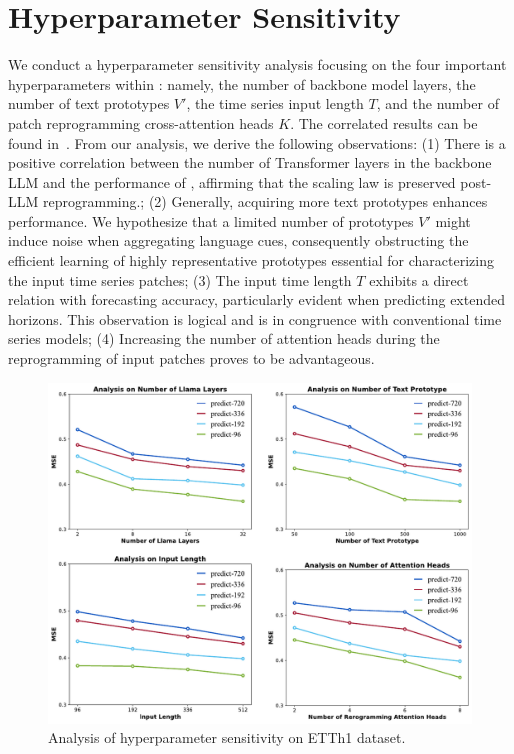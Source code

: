 \section{Hyperparameter Sensitivity}
We conduct a hyperparameter sensitivity analysis focusing on the four important hyperparameters within \method: namely, the number of backbone model layers, the number of text prototypes $V'$, the time series input length $T$, and the number of patch reprogramming cross-attention heads $K$. The correlated results can be found in~. From our analysis, we derive the following observations: (1) There is a positive correlation between the number of Transformer layers in the backbone LLM and the performance of \method, affirming that the scaling law is preserved post-LLM reprogramming.; (2) Generally, acquiring more text prototypes enhances performance. We hypothesize that a limited number of prototypes $V'$ might induce noise when aggregating language cues, consequently obstructing the efficient learning of highly representative prototypes essential for characterizing the input time series patches; (3) The input time length $T$ exhibits a direct relation with forecasting accuracy, particularly evident when predicting extended horizons. This observation is logical and is in congruence with conventional time series models; (4) Increasing the number of attention heads during the reprogramming of input patches proves to be advantageous.


\begin{figure}[!htbp]
\begin{center}
\centerline{\includegraphics[width=0.95\columnwidth]{figures/sensitivity.pdf}}
	\caption{Analysis of hyperparameter sensitivity on ETTh1 dataset.}
	\label{fig:visual_sensitivity}
\end{center}
\vspace{-25pt}
\end{figure}